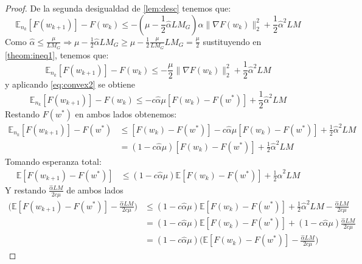 \documentclass{book}
\theoremstyle{plain}
\theoremstyle{definition}
\theoremstyle{remark}
\begin{document}
\begin{proof}
De la segunda desigualdad de \ref{lem:desc} tenemos que:
\begin{equation}\label{theom:ineq1}
    \mathbb{E}_{n_k}[F(w_{k+1})] - F(w_k) \leq -(\mu - \frac{1}{2}\hat{\alpha}LM_G)\hat{\alpha}\|\nabla F(w_k)\|_2^2 + \frac{1}{2}\hat{\alpha}^2LM
\end{equation}
Como $\hat{\alpha}\leq\frac{\mu}{L M_G}\Rightarrow \mu - \frac{1}{2}\hat{\alpha}LM_G \geq \mu - \frac{1}{2}\frac{\mu}{L M_G}LM_G = \frac{\mu}{2}$ sustituyendo en \ref{theom:ineq1}, tenemos que:
\begin{equation}\label{theom:ineq2}
    \mathbb{E}_{n_k}[F(w_{k+1})] - F(w_k) \leq -\frac{\mu}{2}\|\nabla F(w_k)\|_2^2 + \frac{1}{2}\hat{\alpha}^2LM
\end{equation}
y aplicando \ref{eq:convex2} se obtiene
\begin{equation}\label{theom:ineq3}
    \mathbb{E}_{n_k}[F(w_{k+1})] - F(w_k) \leq -c\hat{\alpha}\mu[F(w_k)-F(w^*)] + \frac{1}{2}\hat{\alpha}^2LM
\end{equation}
Restando $F(w^*)$ en ambos lados obtenemos:
\begin{equation*}
\begin{split}
    \mathbb{E}_{n_k}[F(w_{k+1})] - F(w^*) & \leq [F(w_k)-F(w^*)]-c\hat{\alpha}\mu[ F(w_k) -F(w^*)] + \frac{1}{2}\hat{\alpha}^2LM \\
    & = (1-c\hat{\alpha}\mu)[F(w_k) -F(w^*)] + \frac{1}{2}\hat{\alpha}^2LM
    \end{split}
\end{equation*}
Tomando esperanza total:
\begin{equation*}
\begin{split}
    \mathbb{E}[F(w_{k+1}) - F(w^*)] & \leq
    (1-c\hat{\alpha}\mu)\mathbb{E}[F(w_k) -F(w^*)] + \frac{1}{2}\hat{\alpha}^2LM
    \end{split}
\end{equation*}
Y restando $\frac{\hat{\alpha}LM}{2c\mu}$ de ambos lados
\begin{equation}\label{theom:compress}
\begin{split}
    \Big(\mathbb{E}[F(w_{k+1}) - F(w^*)] - \frac{\hat{\alpha}LM}{2c\mu}\Big) & \leq
    (1-c\hat{\alpha}\mu)\mathbb{E}[F(w_k) -F(w^*)] + \frac{1}{2}\hat{\alpha}^2LM - \frac{\hat{\alpha}LM}{2c\mu}\\
    & = (1-c\hat{\alpha}\mu)\mathbb{E}[F(w_k) -F(w^*)] + (1-c\hat{\alpha}\mu)\frac{\hat{\alpha}LM}{2c\mu}\\
    & = (1-c\hat{\alpha}\mu)\Big(\mathbb{E}[F(w_k) -F(w^*)]-\frac{\hat{\alpha}LM}{2c\mu}\Big)

\end{split}
\end{equation}
\end{proof}
\end{document}
